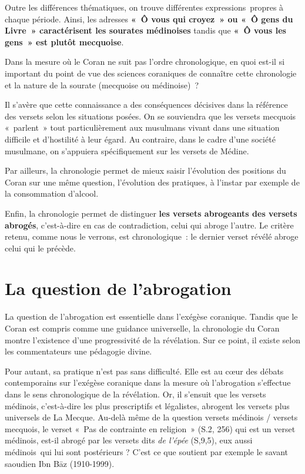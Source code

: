 Outre les différences thématiques, on trouve différentes
expressions~propres à chaque période. Ainsi, les adresses \textbf{«~Ô
vous qui croyez~» ou «~Ô gens du Livre~» caractérisent les sourates
médinoises} tandis que \textbf{«~Ô vous les gens~» est plutôt
mecquoise}.


Dans la mesure où le Coran ne suit pas l'ordre chronologique, en quoi
est-il si important du point de vue des sciences coraniques de connaître
cette chronologie et la nature de la sourate (mecquoise ou médinoise)~?

Il s'avère que cette connaissance a des conséquences décisives dans la
référence des versets selon les situations posées. On se souviendra que
les versets mecquois «~parlent~» tout particulièrement aux musulmans
vivant dans une situation difficile et d'hostilité à leur égard. Au
contraire, dans le cadre d'une société musulmane, on s'appuiera
spécifiquement sur les versets de Médine.

Par ailleurs, la chronologie permet de mieux saisir l'évolution des
positions du Coran sur une même question, l'évolution des pratiques, à
l'instar par exemple de la consommation d'alcool.

Enfin, la chronologie permet de distinguer \textbf{les versets
abrogeants des versets abrogés}, c'est-à-dire en cas de contradiction,
celui qui abroge l'autre. Le critère retenu, comme nous le verrons, est
chronologique~: le dernier verset révélé abroge celui qui le précède.


\section{La question de l'abrogation
}\label{ii.-la-question-de-labrogation}

La question de l'abrogation est essentielle dans l'exégèse coranique.
Tandis que le Coran est compris comme une guidance universelle, la
chronologie du Coran montre l'existence d'une progressivité de la
révélation. Sur ce point, il existe selon les commentateurs une
pédagogie divine.

Pour autant, sa pratique n'est pas sans difficulté. Elle est au cœur des
débats contemporains sur l'exégèse coranique dans la mesure où
l'abrogation s'effectue dans le sens chronologique de la révélation. Or,
il s'ensuit que les versets médinois, c'est-à-dire les plus prescriptifs
et légalistes, abrogent les versets plus universels de La Mecque.
Au-delà même de la question versets médinois / versets mecquois, le
verset «~Pas de contrainte en religion~» (S.2, 256) qui est un verset
médinois, est-il abrogé par les versets dits \emph{de l'épée} (S,9,5),
eux aussi médinois~qui lui sont postérieurs ? C'est ce que soutient par
exemple le savant saoudien Ibn Bāz (1910-1999).

